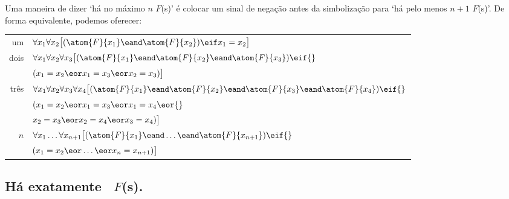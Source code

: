 Uma maneira de dizer `há no máximo $n$ $F$(s)' é colocar um sinal de negação antes da simbolização para `há pelo menos $n+1$ $F$(s)'. De forma equivalente, podemos oferecer: 
\begin{tabular*}{\textwidth}{rl}
um & $\forall x_1\forall x_2\bigl[(\atom{F}{x_1} \eand \atom{F}{x_2}) \eif x_1=x_2\bigr]$\\
dois & $\forall x_1\forall x_2\forall x_3\bigl[(\atom{F}{x_1} \eand \atom{F}{x_2} \eand \atom{F}{x_3}) \eif {}$\\ & $(x_1=x_2 \eor x_1=x_3 \eor x_2=x_3)\bigr]$\\
três & $\forall x_1\forall x_2\forall x_3\forall x_4\bigl[(\atom{F}{x_1} \eand \atom{F}{x_2} \eand \atom{F}{x_3} \eand \atom{F}{x_4}) \eif {}$\\
& $(x_1=x_2 \eor x_1=x_3 \eor x_1=x_4 \eor {}$\\
& $x_2=x_3 \eor x_2=x_4 \eor x_3=x_4)\bigr]$\\
$n$ & $\forall x_1\ldots\forall x_{n+1}
\bigl[(\atom{F}{x_1} \eand \ldots \eand \atom{F}{x_{n+1}}) \eif {}$\\
& $(x_1=x_2 \eor \ldots \eor x_n=x_{n+1})\bigr]$ 
\end{tabular*}


\subsection*{Há exatamente \blank\ $F$(s).}
\label{summary.exactly}

